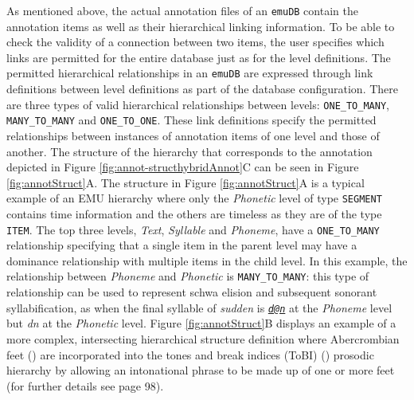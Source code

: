 \documentclass[]{book}
\theoremstyle{definition}
\theoremstyle{definition}
\theoremstyle{definition}
\theoremstyle{remark}
\begin{document}
As mentioned above, the actual annotation files of an \texttt{emuDB}
contain the annotation items as well as their hierarchical linking
information. To be able to check the validity of a connection between
two items, the user specifies which links are permitted for the entire
database just as for the level definitions. The permitted hierarchical
relationships in an \texttt{emuDB} are expressed through link
definitions between level definitions as part of the database
configuration. There are three types of valid hierarchical relationships
between levels: \texttt{ONE\_TO\_MANY}, \texttt{MANY\_TO\_MANY} and
\texttt{ONE\_TO\_ONE}. These link definitions specify the permitted
relationships between instances of annotation items of one level and
those of another. The structure of the hierarchy that corresponds to the
annotation depicted in Figure \ref{fig:annot-structhybridAnnot}C can be
seen in Figure \ref{fig:annotStruct}A. The structure in Figure
\ref{fig:annotStruct}A is a typical example of an EMU hierarchy where
only the \textit{Phonetic} level of type \texttt{SEGMENT} contains time
information and the others are timeless as they are of the type
\texttt{ITEM}. The top three levels, \emph{Text}, \emph{Syllable} and
\emph{Phoneme}, have a \texttt{ONE\_TO\_MANY} relationship specifying
that a single item in the parent level may have a dominance relationship
with multiple items in the child level. In this example, the
relationship between \textit{Phoneme} and \emph{Phonetic} is
\texttt{MANY\_TO\_MANY}: this type of relationship can be used to
represent schwa elision and subsequent sonorant syllabification, as when
the final syllable of \emph{sudden} is
\emph{\href{mailto:d@n}{\nolinkurl{d@n}}} at the \emph{Phoneme} level
but \emph{dn} at the \emph{Phonetic} level. Figure
\ref{fig:annotStruct}B displays an example of a more complex,
intersecting hierarchical structure definition where Abercrombian feet
(\citet{abercombie:1967a}) are incorporated into the tones and break
indices (ToBI) (\citet{beckman:1997aa}) prosodic hierarchy by allowing
an intonational phrase to be made up of one or more feet (for further
details see \citet{harrington:2010a} page 98).
\end{document}
